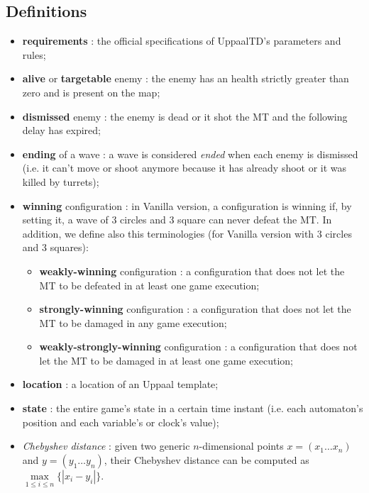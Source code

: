 \documentclass[
10pt, %
a4paper, %
oneside, %
headinclude,footinclude, %
BCOR5mm, %
]{scrartcl}
\begin{document}
		\subsection{Definitions}
			\begin{itemize}
				\item \textbf{requirements} : the official specifications of UppaalTD's parameters and rules;
				\item \textbf{alive} or \textbf{targetable} enemy : the enemy has an health strictly greater than zero and is present on the map;
				\item \textbf{dismissed} enemy : the enemy is dead or it shot the MT and the following delay has expired;
				\item \textbf{ending} of a wave : a wave is considered \emph{ended} when each enemy is dismissed (i.e. it can't move or shoot anymore because it has already shoot or it was killed by turrets);
				\item \textbf{winning} configuration : in Vanilla version, a configuration is winning if, by setting it, a wave of 3 circles and 3 square can never defeat the MT. In addition, we define also this terminologies (for Vanilla version with 3 circles and 3 squares):
					\begin{itemize}
						\item \textbf{weakly-winning} configuration : a configuration that does not let the MT to be defeated in at least one game execution;
						\item \textbf{strongly-winning} configuration : a configuration that does not let the MT to be damaged in any game execution;
						\item \textbf{weakly-strongly-winning} configuration : a configuration that does not let the MT to be damaged in at least one game execution;
					\end{itemize}
				\item \textbf{location} : a location of an Uppaal template;
				\item \textbf{state} : the entire game's state in a certain time instant (i.e. each automaton's position and each variable's or clock's value);
				\item \emph{Chebyshev distance} : given two generic $n$-dimensional points $x=(x_1 \dots x_n)$ and $y=(y_1 \dots y_n)$, their Chebyshev distance can be computed as $\max\limits_{1\leq i\leq n}\{|x_i - y_i|\}$.
			\end{itemize}					
\end{document}
